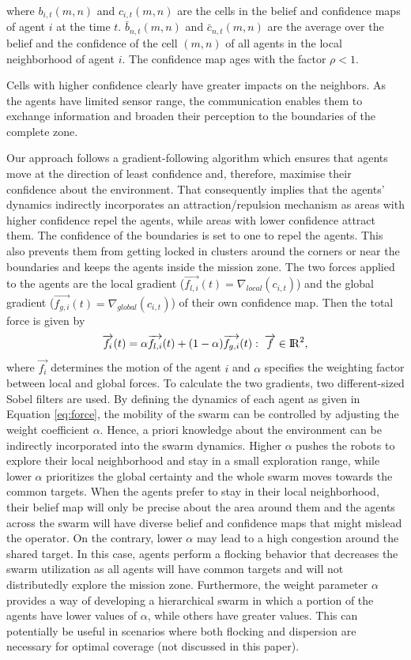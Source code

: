 \documentclass[runningheads]{llncs}%
\begin{document}
where $b_{i,t}(m,n)$ and $c_{i,t}(m,n)$ are the cells in the belief and confidence maps of agent $i$ at the time $t$. $\bar b_{n,t}(m,n)$ and $\bar c_{n,t}(m,n)$ are the average over the belief and the confidence of the cell $(m,n)$ of all agents in the local neighborhood of agent $i$. The confidence map ages with the factor $\rho < 1$. 

Cells with higher confidence clearly have greater impacts on the neighbors. As the agents have limited sensor range, the communication enables them to exchange information and broaden their perception to the boundaries of the complete zone. 

Our approach follows a gradient-following algorithm which ensures that agents move at the direction of least confidence and, therefore, maximise their confidence about the environment. That consequently implies that the agents' dynamics indirectly incorporates an attraction/repulsion mechanism as areas with higher confidence repel the agents, while areas with lower confidence attract them. The confidence of the boundaries is set to one to repel the agents. This also prevents them from getting locked in clusters around the corners or near the boundaries and keeps the agents inside the mission zone. The two forces applied to the agents are the local gradient ($\overrightarrow{f_{l,{i}}}(t) = \nabla_{local} (c_{i,t})$) and the global gradient ($\overrightarrow{f_{g,{i}}}(t) = \nabla_{global} (c_{i,t})$) of their own confidence map. Then the total force is given by
\begin{equation}
\label{eq:force}
    \overrightarrow{f_i} (t)  = \alpha \overrightarrow{f_{l,{i}}} (t) + (1 - \alpha) \overrightarrow{f_{g,{i}}}(t): \; \overrightarrow{f} \in {\rm I\!R}^2,
\end{equation}
where $\overrightarrow{f_i}$ determines the motion of the agent {$i$} and $\alpha$ specifies the weighting factor between local and global forces. To calculate the two gradients, two different-sized Sobel filters are used. By defining the dynamics of each agent as given in Equation \ref{eq:force}, the mobility of the swarm can be controlled by adjusting the weight coefficient $\alpha$. Hence, a priori knowledge about the environment can be indirectly incorporated into the swarm dynamics. Higher $\alpha$ pushes the robots to explore their local neighborhood and stay in a small exploration range, while lower $\alpha$ prioritizes the global certainty and the whole swarm moves towards the common targets. When the agents prefer to stay in their local neighborhood, their belief map will only be precise about the area around them and the agents across the swarm will have diverse belief and confidence maps that might mislead the operator. On the contrary, lower $\alpha$ may lead to a high congestion around the shared target. In this case, agents perform a flocking behavior that decreases the swarm utilization as all agents will have common targets and will not distributedly explore the mission zone. Furthermore, the weight parameter $\alpha$ provides a way of developing a hierarchical swarm in which a portion of the agents have lower values of $\alpha$, while others have greater values. This can potentially be useful in scenarios where both flocking and dispersion are necessary for optimal coverage (not discussed in this paper).  
\end{document}
